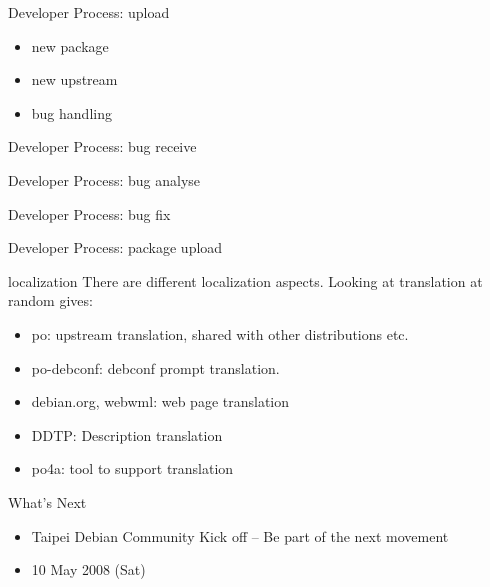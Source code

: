 \documentclass[cjk,dvipdfm,12pt]{beamer}
\begin{document}
\begin{frame}{Developer Process: upload}
 \begin{itemize}
  \item new package 
  \item new upstream
  \item bug handling 
 \end{itemize}
\end{frame}

\begin{frame}{Developer Process: bug receive}

\end{frame}

\begin{frame}{Developer Process: bug analyse}

\end{frame}


\begin{frame}{Developer Process: bug fix}

\end{frame}

\begin{frame}{Developer Process: package upload}

\end{frame}

\begin{frame}{localization}
 There are different localization aspects. Looking at translation at
 random gives:
\begin{itemize}
 \item po: upstream translation, shared with other distributions etc.
 \item po-debconf: debconf prompt translation.
 \item debian.org, webwml: web page translation
 \item DDTP: Description translation
 \item po4a: tool to support translation
\end{itemize}
\end{frame}

\begin{frame}{What's Next}
 \begin{itemize}
  \item Taipei Debian Community Kick off 
	-- Be part of the next movement
  \item 10 May 2008 (Sat)
 \end{itemize}
\end{frame}
\end{document}
